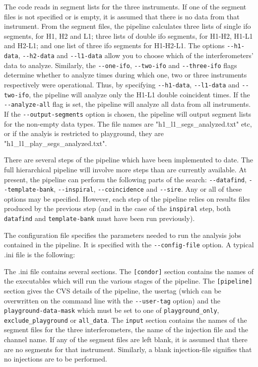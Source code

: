 \begin{entry}
The code reads in segment lists for the three instruments.  If one of the
segment files is not specified or is empty, it is assumed that there is no data
from that instrument.  From the segment files, the pipeline calculates three
lists of single ifo segments, for H1, H2 and L1; three lists of double ifo
segments, for H1-H2, H1-L1 and H2-L1; and one list of three ifo segments for
H1-H2-L1.  The options \verb$--h1-data$, \verb$--h2-data$ and \verb$--l1-data$
allow you to choose which of the interferometers' data to analyze.  Similarly,
the \verb$--one-ifo$, \verb$--two-ifo$ and \verb$--three-ifo$ flags determine
whether to analyze times during which one, two or three instruments
respectively were operational.  Thus, by specifying \verb$--h1-data$,
\verb$--l1-data$ and \verb$--two-ifo$, the pipeline will analyze only the H1-L1
double coincident times.  If the \verb$--analyze-all$ flag is set, the pipeline
will analyze all data from all instruments.  If the \verb$--output-segments$
option is chosen, the pipeline will output segment lists for the non-empty data
types.  The file names are "h1\_l1\_segs\_analyzed.txt" etc, or if the analyis
is restricted to playground, they are "h1\_l1\_play\_segs\_analyzed.txt".

There are several steps of the pipeline which have been implemented to date.
The full hierarchical pipeline will involve more steps than are currently
available.  At present, the pipeline can perform the following parts of the
search: \verb$--datafind$, \verb$--template-bank$, \verb$--inspiral$,
\verb$--coincidence$ and \verb$--sire$.  Any or all of these options may be
specified.  However, each step of the pipeline relies on results files
produced by the previous step (and in the case of the \verb$inspiral$ step,
both \verb$datafind$ and \verb$template-bank$ must have been run previously).


The configuration file specifies the parameters needed to run the analysis jobs
contained in the pipeline.  It is specified with the \verb$--config-file$
option.  A typical .ini file is the following: 

  

The .ini file contains several sections.  The \verb$[condor]$ section contains
the names of the executables which will run the various stages of the
pipeline.  The \verb$[pipeline]$ section gives the CVS details of the
pipeline, the usertag (which can be overwritten on the command line with the
\verb$--user-tag$ option) and the \verb$playground-data-mask$ which must be
set to one of \verb$playground_only$, \verb$exclude_playground$ or
\verb$all_data$.  The \verb$input$ section contains the names of the segment
files for the three interferometers, the name of the injection file and the
channel name.  If any of the segment files are left blank, it is assumed that
there are no segments for  that instrument.  Similarly,  a blank
injection-file signifies that no injections are to be performed.


\end{entry}
